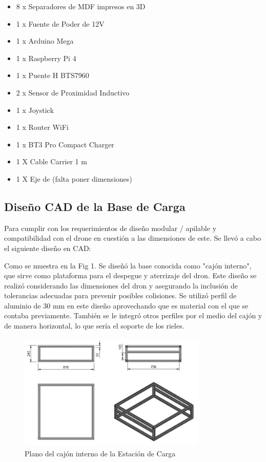 \begin{itemize}
    \item 8 x Separadores de MDF impresos en 3D
    \item 1 x Fuente de Poder de 12V
    \item 1 x Arduino Mega
    \item 1 x Raspberry Pi 4
    \item 1 x Puente H BTS7960 
    \item 2 x Sensor de Proximidad Inductivo
    \item 1 x Joystick
    \item 1 x Router WiFi
    \item 1 x BT3 Pro Compact Charger
    \item 1 X Cable Carrier 1 m
    \item 1 X Eje de (falta poner dimensiones)
\end{itemize}

\subsection{Diseño CAD de la Base de Carga}

Para cumplir con los requerimientos de diseño modular / apilable y compatibilidad con el drone en cuestión a las dimensiones de este. Se llevó a cabo el siguiente diseño en CAD:

Como se muestra en la Fig 1. Se diseñó la base conocida como "cajón interno", que sirve como plataforma para el despegue y aterrizaje del dron. Este diseño se realizó considerando las dimensiones del dron y asegurando la inclusión de tolerancias adecuadas para prevenir posibles colisiones. Se utilizó perfil de aluminio de 30 mm en este diseño aprovechando que es material con el que se contaba previamente. También se le integró otros perfiles por el medio del cajón y de manera horizontal, lo que sería el soporte de los rieles.
        \begin{figure}[htpb]
            \centering
            \includegraphics[width=0.8\textwidth]{PLANOS/PLANOS_CAJON_INTERNO_1.png}
            \caption{Plano del cajón interno de la Estación de Carga}
            \label{fig:etiqueta}
        \end{figure}
        
